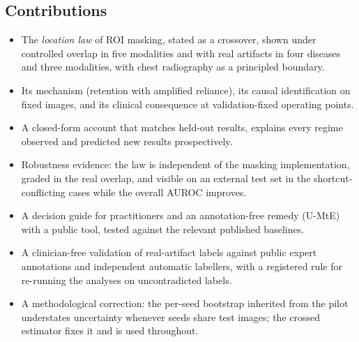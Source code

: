\subsection{Contributions}
\begin{itemize}[leftmargin=*]\itemsep1pt
\item The \emph{location law} of ROI masking, stated as a crossover, shown under controlled overlap in five modalities and
with real artifacts in four diseases and three modalities, with chest radiography as a principled boundary.
\item Its mechanism (retention with amplified reliance), its causal identification on fixed images, and its clinical
consequence at validation-fixed operating points.
\item A closed-form account that matches held-out results, explains every regime observed and predicted new results
prospectively.
\item Robustness evidence: the law is independent of the masking implementation, graded in the real overlap, and visible
on an external test set in the shortcut-conflicting cases while the overall AUROC improves.
\item A decision guide for practitioners and an annotation-free remedy (U-MtE) with a public tool, tested against the
relevant published baselines.
\item A clinician-free validation of real-artifact labels against public expert annotations and independent
automatic labellers, with a registered rule for re-running the analyses on uncontradicted labels.
\item A methodological correction: the per-seed bootstrap inherited from the pilot understates uncertainty whenever
seeds share test images; the crossed estimator fixes it and is used throughout.
\end{itemize}

